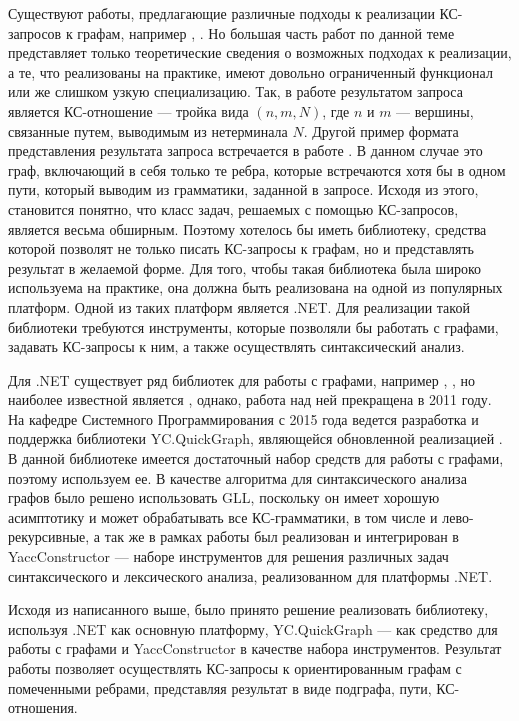 \documentclass[14pt]{matmex-diploma-custom}
\begin{document}
	Существуют работы, предлагающие различные подходы к реализации КС-запросов к графам, например \cite{sevon2008subgraph}, \cite{hellings2014conjunctive}. Но большая часть работ по данной теме представляет только теоретические сведения о возможных подходах к реализации, а те, что реализованы на практике, имеют довольно ограниченный функционал или же слишком узкую специализацию. Так, в работе \cite{hellings2014conjunctive} результатом запроса является КС-отношение --- тройка вида \((n, m, N)\), где \(n\) и \(m\) --- вершины, связанные путем, выводимым из нетерминала \(N\). Другой пример формата представления результата запроса встречается в работе \cite{sevon2008subgraph}. В данном случае это граф, включающий в себя только те ребра, которые встречаются хотя бы в одном пути, который выводим из грамматики, заданной в запросе. Исходя из этого, становится понятно, что класс задач, решаемых с помощью КС-запросов, является весьма обширным. Поэтому хотелось бы иметь библиотеку, средства которой позволят не только писать КС-запросы к графам, но и представлять результат в желаемой форме. Для того, чтобы такая библиотека была широко используема на практике, она должна быть реализована на одной из популярных платформ. Одной из таких платформ является .NET. Для реализации такой библиотеки требуются инструменты, которые позволяли бы работать с графами, задавать КС-запросы к ним, а также осуществлять синтаксический анализ. 
	
	Для .NET существует ряд библиотек для работы с графами, например \cite{graphsharp}, \cite{agl}, но наиболее известной является \cite{quickgraph}, однако, работа над ней прекращена в 2011 году. На кафедре Системного Программирования с 2015 года ведется разработка и поддержка библиотеки YC.QuickGraph\cite{YC.QuickGraph}, являющейся обновленной реализацией \cite{quickgraph}. В данной библиотеке имеется достаточный набор средств для работы с графами, поэтому используем ее. В качестве алгоритма для синтаксического анализа графов было решено использовать GLL\cite{gll}, поскольку он имеет хорошую асимптотику и может обрабатывать все КС-грамматики, в том числе и лево-рекурсивные, а так же в рамках работы \cite{ragRelaxedParsing} был реализован и интегрирован в YaccConstructor \cite{YaccConstructorPage} --- наборе инструментов для решения различных задач синтаксического и лексического анализа, реализованном для платформы .NET. 
	
	Исходя из написанного выше, было принято решение реализовать библиотеку, используя .NET как основную платформу, YC.QuickGraph --- как средство для работы с графами и YaccConstructor в качестве набора инструментов. Результат работы позволяет осуществлять КС-запросы к ориентированным графам с помеченными ребрами, представляя результат в виде подграфа, пути, КС-отношения.
	
\end{document}
